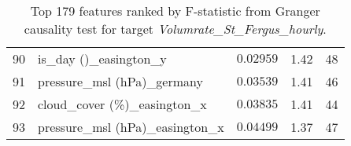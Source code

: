 \begin{table}[H]
\begin{tabular}{r l l l l}
        90 & is\_day ()\_easington\_y & $0.02959$ & 1.42 & 48 \\
        91 & pressure\_msl (hPa)\_germany & $0.03539$ & 1.41 & 46 \\
        92 & cloud\_cover (\%)\_easington\_x & $0.03835$ & 1.41 & 44 \\
        93 & pressure\_msl (hPa)\_easington\_x & $0.04499$ & 1.37 & 47 \\
        \hline
    \end{tabular}
    \caption{Top 179 features ranked by F-statistic from Granger causality test for target \textit{Volumrate\_St_Fergus\_hourly}.}
    \label{tab:granger_St_Fergus_fstat}
\end{table}